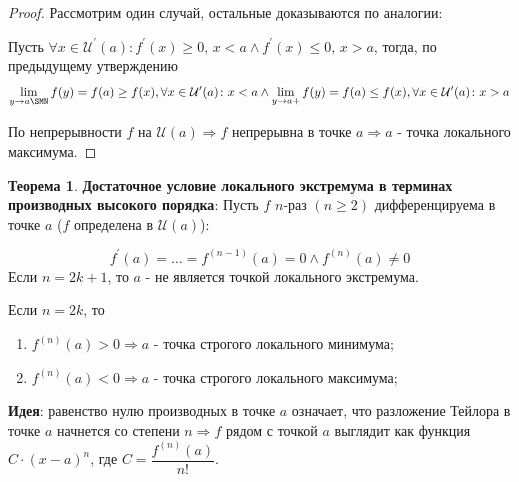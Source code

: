 \documentclass[12pt]{article}
\newcommand{\MU}{\mathcal{U}}
\theoremstyle{definition}
\newtheorem{theorem}{Теорема}
\begin{document}
\begin{proof}
	Рассмотрим один случай, остальные доказываются по аналогии:
	
	Пусть $\forall x \in \MU^\prime(a) \colon f^{\prime}(x) \geq 0, \, x < a \wedge f^{\prime}(x) \leq 0, \, x > a$, тогда, по предыдущему утверждению 
	$$\lim\limits_{y \to a\SMN}f(y) =f(a) \geq f(x), \forall x \in \MU^\prime(a) \colon x < a \wedge \lim\limits_{y \to a+}f(y) =f(a) \leq f(x), \forall x \in \MU^\prime(a) \colon  x > a$$
	
	По непрерывности $f$ на $\MU(a) \Rightarrow f$ непрерывна в точке $a \Rightarrow a$ - точка локального максимума.
\end{proof}
	
\begin{theorem}
	\textbf{Достаточное условие локального экстремума в терминах производных высокого порядка}: Пусть $f$ $n$-раз $(n \geq 2)$ дифференцируема в точке $a$ ($f$ определена в $\MU(a)$):
	
	$$f^\prime(a) = \dotsc = f^{(n-1)}(a) = 0\wedge f^{(n)}(a) \neq 0$$
	Если $n = 2k + 1$, то $a$ - не является точкой локального экстремума. 
	
	Если $n = 2k$, то
	\begin{enumerate}[label={\arabic*)}]
		\item $f^{(n)}(a) > 0 \Rightarrow a$ - точка строгого локального минимума;
		\item $f^{(n)}(a) < 0 \Rightarrow a$ - точка строгого локального максимума;
	\end{enumerate}
\end{theorem}

\textbf{Идея}: равенство нулю производных в точке $a$ означает, что разложение Тейлора в точке $a$ начнется со степени $n \Rightarrow f$ рядом с точкой $a$ выглядит как функция $C{\cdot}(x-a)^n$, где $C = \dfrac{f^{(n)}(a)}{n!}$.
\end{document}
